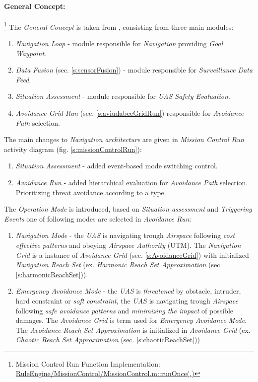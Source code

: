 \paragraph{General Concept:}\footnote{Mission Control Run Function Implementation: \url{RuleEngine/MissionControl/MissionControl.m::runOnce(.)}} The \emph{General Concept} is taken from  \cite{sabatini2014navigation,Sabatini2014}, consisting from three main modules:
\begin{enumerate}
    \item \emph{Navigation Loop} - module responsible for \emph{Navigation} providing \emph{Goal Waypoint}.
    
    \item \emph{Data Fusion} (sec. \ref{s:sensorFusion}) - module responsible for \emph{Surveillance Data Feed}.
    
    \item \emph{Situation Assessment} - module responsible for \emph{UAS Safety Evaluation}. 
    
    \item \emph{Avoidance Grid Run} (sec. \ref{s:aviudabceGridRun}) responsible for \emph{Avoidance Path} selection.    
\end{enumerate}

\noindent The main changes to \emph{Navigation architecture} are given in \emph{Mission Control Run} activity diagram (fig. \ref{s:missionControlRun}):
\begin{enumerate}
    \item \emph{Situation Assessment} - added event-based mode switching control. 
   
    \item \emph{Avoidance Run} - added hierarchical evaluation for \emph{Avoidance Path} selection. Prioritizing threat avoidance according to a type. 
\end{enumerate}

\noindent The \emph{Operation Mode} is introduced, based on \emph{Situation assessment} and \emph{Triggering Events} one of following modes are selected in \emph{Avoidance Run}:

\begin{enumerate}
    \item \emph{Navigation Mode} - the \emph{UAS} is navigating trough \emph{Airspace} following \emph{cost effective patterns} and obeying \emph{Airspace Authority} (UTM). The \emph{Navigation Grid} is a instance of \emph{Avoidance Grid} (sec. \ref{s:AvoidanceGrid}) with initialized \emph{Navigation Reach Set} (ex. \emph{Harmonic Reach Set Approximation} (sec. \ref{s:harmonicReachSet})).
    
    \item \emph{Emergency Avoidance Mode} - the \emph{UAS} is \emph{threatened} by obstacle, intruder, hard constraint or \emph{soft constraint}, the \emph{UAS} is navigating trough \emph{Airspace} following \emph{safe avoidance patterns} and \emph{minimizing the impact} of possible damages. The \emph{Avoidance Grid} is term used for \emph{Emergency Avoidance Mode}. The \emph{Avoidance Reach Set Approximation} is initialized in \emph{Avoidance Grid} (ex. \emph{Chaotic Reach Set Approximation} (sec. \ref{s:chaoticReachSet}))
\end{enumerate}

